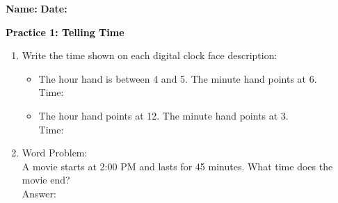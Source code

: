 \documentclass[12pt, letterpaper, fleqn]{article}
\newcommand{\blank}{\underline{\hspace{2.2cm}}}
\begin{document}
\textbf{Name:} \underline{\hspace{5cm}}
\hfill
\textbf{Date:} \underline{\hspace{3cm}}\\

\begin{tcolorbox}[colback=customteal!20]
    \large\textcolor{black}{\textbf{Practice 1: Telling Time}}
\end{tcolorbox}

\vspace{5mm}
\begin{enumerate}[itemsep=3.5cm, leftmargin=0.6cm]
\item Write the time shown on each digital clock face description:
  \begin{itemize}[itemsep=1cm]
    \item The hour hand is between 4 and 5. The minute hand points at 6. \\ Time: \blank
    \item The hour hand points at 12. The minute hand points at 3. \\ Time: \blank
  \end{itemize}

\item Word Problem:
\\
A movie starts at 2:00 PM and lasts for 45 minutes. What time does the movie end?
\\
Answer: \blank
\end{enumerate}
\end{document}

